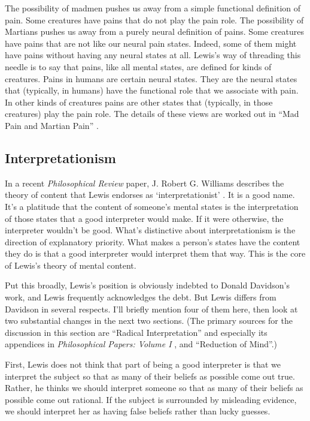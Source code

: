 The possibility of madmen pushes us away from a simple functional definition of pain. Some creatures have pains that do not play the pain role. The possibility of Martians pushes us away from a purely neural definition of pains. Some creatures have pains that are not like our neural pain states. Indeed, some of them might have pains without having any neural states at all. Lewis's way of threading this needle is to say that pains, like all mental states, are defined for kinds of creatures. Pains in humans are certain neural states. They are the neural states that (typically, in humans) have the functional role that we associate with pain. In other kinds of creatures pains are other states that (typically, in those creatures) play the pain role. The details of these views are worked out in ``Mad Pain and Martian Pain'' \citeyearpar{Lewis1980c}.

\subsection{Interpretationism} 
In a recent \textit{Philosophical Review} paper, J. Robert G. Williams describes the theory of content that Lewis endorses as `interpretationist' \citep{Williams2007}. It is a good name. It's a platitude that the content of someone's mental states is the interpretation of those states that a good interpreter would make. If it were otherwise, the interpreter wouldn't be good. What's distinctive about interpretationism is the direction of explanatory priority. What makes a person's states have the content they do is that a good interpreter would interpret them that way. This is the core of Lewis's theory of mental content.

Put this broadly, Lewis's position is obviously indebted to Donald Davidson's work, and Lewis frequently acknowledges the debt. But Lewis differs from Davidson in several respects. I'll briefly mention four of them here, then look at two substantial changes in the next two sections. (The primary sources for the discussion in this section are ``Radical Interpretation'' \citeyearpar{Lewis1974c} and especially its appendices in \textit{Philosophical Papers: Volume I} \citeyearpar{Lewis1983a}, and ``Reduction of Mind''.)

First, Lewis does not think that part of being a good interpreter is that we interpret the subject so that as many of their beliefs as possible come out true. Rather, he thinks we should interpret someone so that as many of their beliefs as possible come out rational. If the subject is surrounded by misleading evidence, we should interpret her as having false beliefs rather than lucky guesses.

